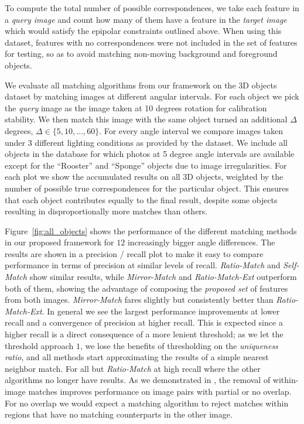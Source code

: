 \documentclass[10pt,journal,cspaper,compsoc]{IEEEtran}
\begin{document}
To compute the total number of possible correspondences, we take each 
feature in a \emph{query image} and count how many of them have a 
feature in the \emph{target image} which would satisfy the epipolar 
constraints outlined above. When using this dataset, features 
with no correspondences were not included in the set of features for testing, 
so as to avoid matching non-moving background and 
foreground objects.

We evaluate all matching algorithms from our framework on the 3D objects dataset by 
matching images at different angular intervals. For each object we 
pick the \emph{query} image as the image taken at 10 degrees rotation 
for calibration stability.  We then match this image with 
the same object turned an additional $\Delta$ degrees, $\Delta \in \{5, 10, 
\ldots, 60\}$.  For every angle interval we compare images taken under 
3 different lighting conditions as provided by the dataset.
We include all objects in the database for which photos at 5 degree 
angle intervals are available except for the ``Rooster'' and ``Sponge'' 
objects due to image irregularities. For each plot we show the 
accumulated results on all 3D objects, weighted by the number of possible 
true correspondences for the particular object. This ensures that each 
object contributes equally to the final result, despite some objects
resulting in disproportionally more matches than others.

Figure~\ref{fig:all_objects} shows the performance of the different matching methods in our proposed framework for $12$ increasingly bigger angle differences. The results are shown in a precision / recall plot to make it easy to compare performance in terms of precision at similar levels of recall.  \emph{Ratio-Match} and \emph{Self-Match} show similar results, while \emph{Mirror-Match} and \emph{Ratio-Match-Ext} outperform both of them, showing the advantage of composing the \emph{proposed set} of features from both images. \emph{Mirror-Match} fares slightly but consistently better than \emph{Ratio-Match-Ext}. In general we see the largest performance improvements at lower recall and a  convergence of precision at higher recall. This is expected since a higher recall is a direct consequence of a more lenient threshold; as we let the threshold approach $1$, we lose the benefits of thresholding on the \emph{uniqueness ratio}, and all methods start approximating the results of a simple nearest neighbor match. For all but 
\emph{Ratio-Match} at high recall where the other algorithms no longer have results. As we demonstrated in \cite{arnfred2013mirror}, the removal 
of within-image matches improves performance on image pairs with partial 
or no overlap. For no overlap we would expect a matching algorithm to 
reject matches within regions that have no matching counterparts in the 
other image.
\end{document}

